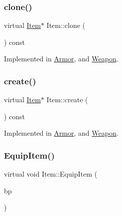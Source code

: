 \subsubsection{\texorpdfstring{clone()}{clone()}}
{\footnotesize\ttfamily virtual \mbox{\hyperlink{class_item}{Item}}$\ast$ Item\+::clone (\begin{DoxyParamCaption}{ }\end{DoxyParamCaption}) const\hspace{0.3cm}{\ttfamily [pure virtual]}}



Implemented in \mbox{\hyperlink{class_armor_aac8aec108de9a8a45bada1534c0f23b7}{Armor}}, and \mbox{\hyperlink{class_weapon_a4a914fa26d1d67a5d890252950f6b9be}{Weapon}}.

\mbox{\label{class_item_a17b3fa0cef44ada961e0d3c65e1de864}} 
\subsubsection{\texorpdfstring{create()}{create()}}
{\footnotesize\ttfamily virtual \mbox{\hyperlink{class_item}{Item}}$\ast$ Item\+::create (\begin{DoxyParamCaption}{ }\end{DoxyParamCaption}) const\hspace{0.3cm}{\ttfamily [pure virtual]}}



Implemented in \mbox{\hyperlink{class_armor_a21de0acaa6ecdb6f5937166b83da9b01}{Armor}}, and \mbox{\hyperlink{class_weapon_a0755dc1352391eb484644ab4e4cf144d}{Weapon}}.

\mbox{\label{class_item_af4b9caf8fcfc22bbde13bf6c3505b35c}} 
\subsubsection{\texorpdfstring{Equip\+Item()}{EquipItem()}}
{\footnotesize\ttfamily virtual void Item\+::\+Equip\+Item (\begin{DoxyParamCaption}\item[{\mbox{\hyperlink{class_body_part}{Body\+Part}} \&}]{bp }\end{DoxyParamCaption})\hspace{0.3cm}{\ttfamily [pure virtual]}}



